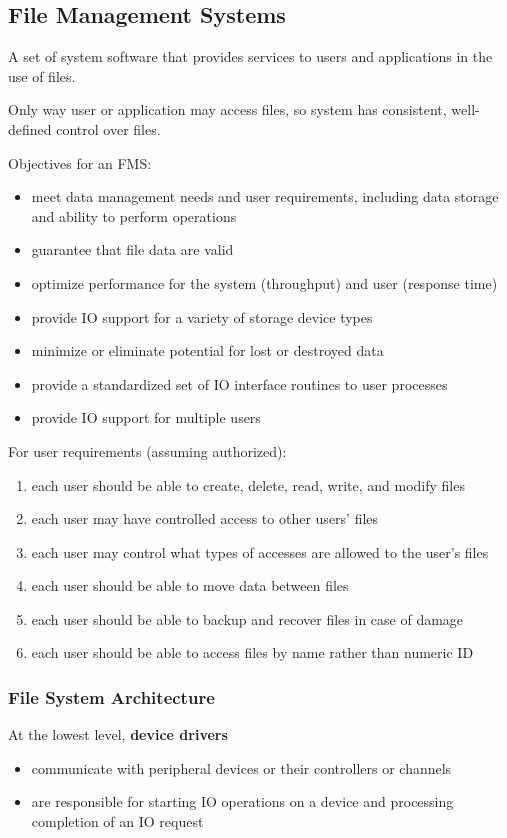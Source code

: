 \documentclass[11pt]{article}
\begin{document}
\subsection{File Management Systems}
\label{sec:org483c808}
A set of system software that provides services to users and applications in the use of files.

Only way user or application may access files, so system has consistent, well-defined control
over files.

Objectives for an FMS:
\begin{itemize}
\item meet data management needs and user requirements, including data storage and ability to
perform operations
\item guarantee that file data are valid
\item optimize performance for the system (throughput) and user (response time)
\item provide IO support for a variety of storage device types
\item minimize or eliminate potential for lost or destroyed data
\item provide a standardized set of IO interface routines to user processes
\item provide IO support for multiple users
\end{itemize}

For user requirements (assuming authorized):
\begin{enumerate}
\item each user should be able to create, delete, read, write, and modify files
\item each user may have controlled access to other users' files
\item each user may control what types of accesses are allowed to the user's files
\item each user should be able to move data between files
\item each user should be able to backup and recover files in case of damage
\item each user should be able to access files by name rather than numeric ID
\end{enumerate}
\subsubsection{File System Architecture}
\label{sec:org56d6e2a}
At the lowest level, \textbf{device drivers}
\begin{itemize}
\item communicate with peripheral devices or their controllers or channels
\item are responsible for starting IO operations on a device and processing completion of an
IO request
\end{itemize}
\end{document}
